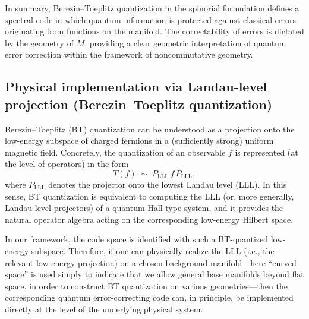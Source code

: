 \documentclass[12pt]{article}
\theoremstyle{definition} %
\theoremstyle{plain} %
\theoremstyle{remark} %
\theoremstyle{underline}
\begin{document}
In summary, Berezin--Toeplitz quantization in the spinorial formulation defines a spectral code in which quantum information is protected against classical errors originating from functions on the manifold. 
The correctability of errors is dictated by the geometry of $M$, providing a clear geometric interpretation of quantum error correction within the framework of noncommutative geometry.

\subsection{Physical implementation via Landau-level projection (Berezin--Toeplitz quantization)}

Berezin--Toeplitz (BT) quantization can be understood as a projection onto the low-energy subspace of charged fermions in a (sufficiently strong) uniform magnetic field.
Concretely, the quantization of an observable $f$ is represented (at the level of operators) in the form
\begin{equation}
    T(f)\;\sim\; P_{\mathrm{LLL}}\, f\, P_{\mathrm{LLL}},
\end{equation}
where $P_{\mathrm{LLL}}$ denotes the projector onto the lowest Landau level (LLL).
In this sense, BT quantization is equivalent to computing the LLL (or, more generally, Landau-level projectors) of a quantum Hall type system, and it provides the natural operator algebra acting on the corresponding low-energy Hilbert space.

In our framework, the code space is identified with such a BT-quantized low-energy subspace.
Therefore, if one can physically realize the LLL (i.e., the relevant low-energy projection) on a chosen background manifold---here ``curved space'' is used simply to indicate that we allow general base manifolds beyond flat space, in order to construct BT quantization on various geometries---then the corresponding quantum error-correcting code can, in principle, be implemented directly at the level of the underlying physical system.
\end{document}
